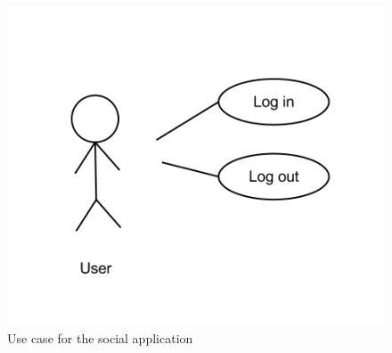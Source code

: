   \begin{figure}[h!]
  \centering \includegraphics[scale=0.50]{img/req-socialappusecase2.png}
  \caption{Use case for the social application}
  \label{fig:req-tshirtappusecase2}
  \end{figure}